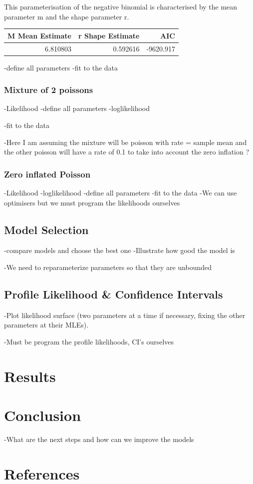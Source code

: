 \documentclass[11pt,preprint, authoryear]{elsarticle}
\numberwithin{equation}{section}
\numberwithin{figure}{section}
\numberwithin{table}{section}
\begin{document}
This parameterisation of the negative binomial is characterised by the
mean parameter m and the shape parameter r.

\begin{longtable}[]{@{}rrr@{}}
\toprule
M Mean Estimate & r Shape Estimate & AIC\tabularnewline
\midrule
\endhead
6.810803 & 0.592616 & -9620.917\tabularnewline
\bottomrule
\end{longtable}

-define all parameters -fit to the data

\subsubsection{Mixture of 2 poissons}\label{mixture-of-2-poissons}

-Likelihood -define all parameters -loglikelihood

-fit to the data

-Here I am assuming the mixture will be poisson with rate = sample mean
and the other poisson will have a rate of 0.1 to take into account the
zero inflation ?

\subsubsection{Zero inflated Poisson}\label{zero-inflated-poisson}

-Likelihood -loglikelihood -define all parameters -fit to the data -We
can use optimisers but we must program the likelihoods ourselves

\subsection{Model Selection}\label{model-selection}

-compare models and choose the best one -Illustrate how good the model
is

-We need to reparameterize parameters so that they are unbounded

\subsection{Profile Likelihood \& Confidence
Intervals}\label{profile-likelihood-confidence-intervals}

-Plot likelihood surface (two parameters at a time if necessary, fixing
the other parameters at their MLEs).

-Must be program the profile likelihoods, CI's ourselves

\section{Results}\label{results}

\section{Conclusion}\label{conclusion}

-What are the next steps and how can we improve the models

\section{References}\label{references}

\newpage
\nocite{*}

\end{document}
